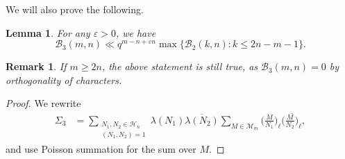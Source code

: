 \documentclass[12pt]{amsart}
\newtheorem{lemma}[theorem]{Lemma}
\newtheorem{remark}[theorem]{Remark}
\begin{document}
We will also prove the following.
\begin{lemma}
\label{lem8}
For any $\varepsilon>0$, we have
$$\mathcal{B}_3(m,n) \ll q^{m-n+\varepsilon n} \max \{ \mathcal{B}_2(k,n) : k \leq 2n-m-1 \}.$$
\end{lemma}
\begin{remark}
 If $m \geq 2n$, the above statement is still true, as $\mathcal{B}_3(m,n)=0$ by orthogonality of characters.
\end{remark}
\begin{proof}
We rewrite
\begin{align*}
\Sigma_3 &= \sum_{\substack{N_1,N_2\in \mathcal{H}_n\\(N_1,N_2)=1}} \lambda(N_1) \overline{ \lambda(N_2)} \sum_{M \in \mathcal{M}_m}  \Big(  \frac{M}{N_1} \Big)_{\ell} \overline{ \Big(  \frac{M}{N_2} \Big)_{\ell}},
\end{align*}
and use Poisson summation for the sum over $M$.


\end{proof}
\end{document}

